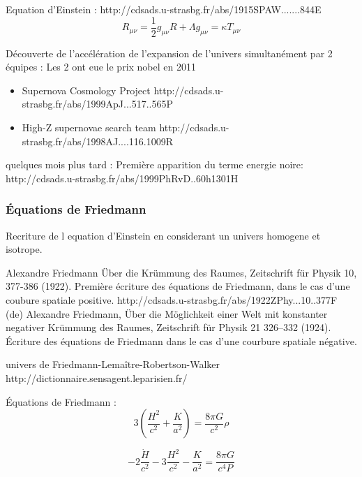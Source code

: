 Equation d'Einstein :
http://cdsads.u-strasbg.fr/abs/1915SPAW.......844E
\begin{equation}
R_{\mu\nu} = \frac{1}{2} g_{\mu\nu}R + \Lambda g_{\mu\nu}  = \kappa T_{\mu\nu}
\end{equation} 



Découverte de l'accélération de l'expansion de l'univers simultanément par 2 équipes :
Les 2 ont eue le prix nobel en 2011

\begin{itemize}
\item  Supernova Cosmology Project
 http://cdsads.u-strasbg.fr/abs/1999ApJ...517..565P
 
 \item  High-Z supernovae search team
http://cdsads.u-strasbg.fr/abs/1998AJ....116.1009R

\end{itemize}

quelques mois plus tard :
Première apparition du terme energie noire:
http://cdsads.u-strasbg.fr/abs/1999PhRvD..60h1301H



\subsubsection{ Équations de Friedmann }

 Recriture de l equation d'Einstein en considerant un univers homogene et isotrope.
 
 Alexandre Friedmann Über die Krümmung des Raumes, Zeitschrift für Physik 10, 377-386 (1922). Première écriture des équations de Friedmann, dans le cas d'une coubure spatiale positive. http://cdsads.u-strasbg.fr/abs/1922ZPhy...10..377F 
(de) Alexandre Friedmann, Über die Möglichkeit einer Welt mit konstanter negativer Krümmung des Raumes, Zeitschrift für Physik 21 326–332 (1924). Écriture des équations de Friedmann dans le cas d'une courbure spatiale négative. 
 
univers de Friedmann-Lemaître-Robertson-Walker  
http://dictionnaire.sensagent.leparisien.fr/%
 
Équations de Friedmann : 
\begin{equation}
3 \left( \frac{H^2}{c^2} +\frac{K}{a^2} \right) = \frac{8 \pi G }{c^2} \rho
\label{eq:friedman1}
\end{equation}

\begin{equation}
-2 \frac{ \dot{H}}{c^2} -3 \frac{H^2}{c^2} -\frac{K}{a^2} = \frac{8 \pi G }{c^4 P}
\label{eq:friedman2}
\end{equation}

